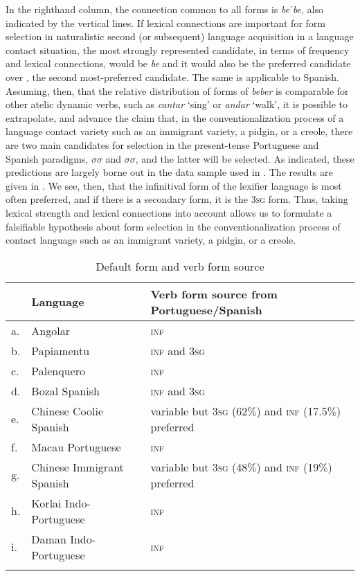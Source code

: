 \documentclass[output=paper,colorlinks,citecolor=brown]{langscibook}
\begin{document}
In the righthand column, the connection common to all forms is \textit{beˈbe}, also indicated by the vertical lines. If lexical connections are important for form selection in naturalistic second (or subsequent) language acquisition in a language contact situation, the most strongly represented candidate, in terms of frequency and lexical connections, would be \textit{be\textbf{}} and it would also be the preferred candidate over \textit{}, the second most-preferred candidate. The same is applicable to Spanish. Assuming, then, that the relative distribution of forms of \textit{beber} is comparable for other atelic dynamic verbs, such as \textit{cantar} `sing' or \textit{andar} `walk', it is possible to extrapolate, and advance the claim that, in the conventionalization process of a language contact variety such as an immigrant variety, a pidgin, or a creole, there are two main candidates for selection in the present-tense Portuguese and Spanish paradigms, \textprimstress$\sigma$$\sigma$ and $\sigma$\textprimstress$\sigma$, and the latter will be selected. As indicated, these predictions are largely borne out in the data sample used in \citet{Clements2014,Clements2018}. The results are given in . We see, then, that the infinitival form of the lexifier language is most often preferred, and if there is a secondary form, it is the \textsc{3sg} form. Thus, taking lexical strength and lexical connections into account allows us to formulate a falsifiable hypothesis about form selection in the conventionalization process of contact language such as an immigrant variety, a pidgin, or a creole.


\begin{table}
\begin{tabularx}{\textwidth}{l@{ }lQ}
\lsptoprule
  & Language  & Verb form source from Portuguese/Spanish\\\midrule
a.& Angolar & \textsc{inf}\\
b.& Papiamentu & \textsc{inf} and 3\textsc{sg}\\
c.& Palenquero & \textsc{inf}\\
d.& Bozal Spanish & \textsc{inf} and 3\textsc{sg}\\
e.& Chinese Coolie Spanish & variable but 3\textsc{sg} (62$\%$) and \textsc{inf} (17.5$\%$) preferred\\
f.& Macau Portuguese & \textsc{inf}\\
g.& Chinese Immigrant Spanish & variable but 3\textsc{sg} (48$\%$) and \textsc{inf} (19$\%$) preferred\\
h.& Korlai Indo-Portuguese & \textsc{inf}\\
i.& Daman Indo-Portuguese & \textsc{inf}\\
\lspbottomrule
\end{tabularx}
\caption{Default form and verb form source\label{tab:clements:4}}
\end{table}
\end{document}
